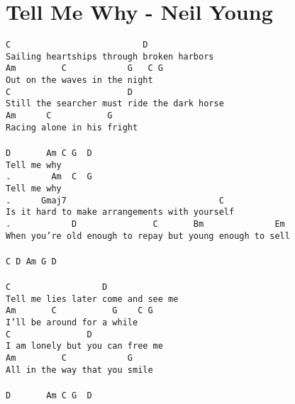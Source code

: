 \newpage
\section{Tell Me Why - Neil Young}
\label{Tell Me Why - Neil Young}
\texttt{C\ \ \ \ \ \ \ \ \ \ \ \ \ \ \ \ \ \ \ \ \ \ \ \ \ \ D\\
Sailing\ heartships\ through\ broken\ harbors\\
Am\ \ \ \ \ \ \ \ \ C\ \ \ \ \ \ \ \ \ \ \ \ G\ \ \ C\ G\\
Out\ on\ the\ waves\ in\ the\ night\ \\
C\ \ \ \ \ \ \ \ \ \ \ \ \ \ \ \ \ \ \ \ \ \ \ D\\
Still\ the\ searcher\ must\ ride\ the\ dark\ horse\\
Am\ \ \ \ \ \ C\ \ \ \ \ \ \ \ \ \ \ G\\
Racing\ alone\ in\ his\ fright\\
\\
D\ \ \ \ \ \ \ Am\ C\ G\ \ D\\
Tell\ me\ why\ \ \\
.\ \ \ \ \ \ \ \ Am\ \ C\ \ G\\
Tell\ me\ why\ \ \\
.\ \ \ \ \ \ Gmaj7\ \ \ \ \ \ \ \ \ \ \ \ \ \ \ \ \ \ \ \ \ \ \ \ \ \ \ \ \ \ C\\
Is\ it\ hard\ to\ make\ arrangements\ with\ yourself\\
.\ \ \ \ \ \ \ \ \ \ \ \ D\ \ \ \ \ \ \ \ \ \ \ \ \ \ \ C\ \ \ \ \ \ \ Bm\ \ \ \ \ \ \ \ \ \ \ \ \ \ Em\ \ \ \\
When\ you're\ old\ enough\ to\ repay\ but\ young\ enough\ to\ sell\\
\\
C\ D\ Am\ G\ D\\
\\
C\ \ \ \ \ \ \ \ \ \ \ \ \ \ \ \ \ \ D\\
Tell\ me\ lies\ later\ come\ and\ see\ me\\
Am\ \ \ \ \ \ \ C\ \ \ \ \ \ \ \ \ \ \ G\ \ \ \ C\ G\\
I'll\ be\ around\ for\ a\ while\ \\
C\ \ \ \ \ \ \ \ \ \ \ \ \ \ \ D\\
I\ am\ lonely\ but\ you\ can\ free\ me\\
Am\ \ \ \ \ \ \ \ \ C\ \ \ \ \ \ \ \ \ \ \ \ G\\
All\ in\ the\ way\ that\ you\ smile\\
\\
D\ \ \ \ \ \ \ Am\ C\ G\ \ D\\
}
